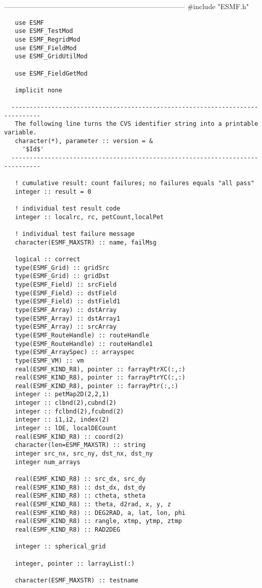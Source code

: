   -----------------------------------------------------------------------------
 #include "ESMF.h"
\begin{verbatim}   use ESMF
   use ESMF_TestMod
   use ESMF_RegridMod
   use ESMF_FieldMod
   use ESMF_GridUtilMod
 
   use ESMF_FieldGetMod
 
   implicit none
 
  ------------------------------------------------------------------------------
   The following line turns the CVS identifier string into a printable variable.
   character(*), parameter :: version = &
     '$Id$'
  ------------------------------------------------------------------------------
     
   ! cumulative result: count failures; no failures equals "all pass"
   integer :: result = 0
 
   ! individual test result code
   integer :: localrc, rc, petCount,localPet
 
   ! individual test failure message
   character(ESMF_MAXSTR) :: name, failMsg
 
   logical :: correct
   type(ESMF_Grid) :: gridSrc
   type(ESMF_Grid) :: gridDst
   type(ESMF_Field) :: srcField
   type(ESMF_Field) :: dstField
   type(ESMF_Field) :: dstField1
   type(ESMF_Array) :: dstArray
   type(ESMF_Array) :: dstArray1
   type(ESMF_Array) :: srcArray
   type(ESMF_RouteHandle) :: routeHandle
   type(ESMF_RouteHandle) :: routeHandle1
   type(ESMF_ArraySpec) :: arrayspec
   type(ESMF_VM) :: vm
   real(ESMF_KIND_R8), pointer :: farrayPtrXC(:,:)
   real(ESMF_KIND_R8), pointer :: farrayPtrYC(:,:)
   real(ESMF_KIND_R8), pointer :: farrayPtr(:,:)
   integer :: petMap2D(2,2,1)
   integer :: clbnd(2),cubnd(2)
   integer :: fclbnd(2),fcubnd(2)
   integer :: i1,i2, index(2)
   integer :: lDE, localDECount
   real(ESMF_KIND_R8) :: coord(2)
   character(len=ESMF_MAXSTR) :: string
   integer src_nx, src_ny, dst_nx, dst_ny
   integer num_arrays
 
   real(ESMF_KIND_R8) :: src_dx, src_dy
   real(ESMF_KIND_R8) :: dst_dx, dst_dy
   real(ESMF_KIND_R8) :: ctheta, stheta
   real(ESMF_KIND_R8) :: theta, d2rad, x, y, z
   real(ESMF_KIND_R8) :: DEG2RAD, a, lat, lon, phi
   real(ESMF_KIND_R8) :: rangle, xtmp, ytmp, ztmp
   real(ESMF_KIND_R8) :: RAD2DEG
 
   integer :: spherical_grid
 
   integer, pointer :: larrayList(:)
 
   character(ESMF_MAXSTR) :: testname
 

\end{verbatim}
